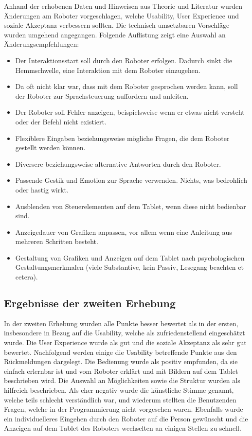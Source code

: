 \documentclass[a4paper,
fontsize=11pt,
oneside,
numbers=noperiodatend,
parskip=half-,
bibliography=totoc,
final
]{scrartcl}
\begin{document}
Anhand der erhobenen Daten und Hinweisen aus Theorie und Literatur
wurden Änderungen am Roboter vorgeschlagen, welche Usability, User
Experience und soziale Akzeptanz verbessern sollten. Die technisch
umsetzbaren Vorschläge wurden umgehend angegangen. Folgende Auflistung
zeigt eine Auswahl an Änderungsempfehlungen:

\begin{itemize}
\item
  Der Interaktionsstart soll durch den Roboter erfolgen. Dadurch sinkt
  die Hemmschwelle, eine Interaktion mit dem Roboter einzugehen.
\item
  Da oft nicht klar war, dass mit dem Roboter gesprochen werden kann,
  soll der Roboter zur Sprachsteuerung auffordern und anleiten.
\item
  Der Roboter soll Fehler anzeigen, beispielsweise wenn er etwas nicht
  versteht oder der Befehl nicht existiert.
\item
  Flexiblere Eingaben beziehungsweise mögliche Fragen, die dem Roboter
  gestellt werden können.
\item
  Diversere beziehungsweise alternative Antworten durch den Roboter.
\item
  Passende Gestik und Emotion zur Sprache verwenden. Nichts, was
  bedrohlich oder hastig wirkt.
\item
  Ausblenden von Steuerelementen auf dem Tablet, wenn diese nicht
  bedienbar sind.
\item
  Anzeigedauer von Grafiken anpassen, vor allem wenn eine Anleitung aus
  mehreren Schritten besteht.
\item
  Gestaltung von Grafiken und Anzeigen auf dem Tablet nach
  psychologischen Gestaltungsmerkmalen (viele Substantive, kein Passiv,
  Lesegang beachten et cetera).
\end{itemize}

\hypertarget{ergebnisse-der-zweiten-erhebung}{%
\subsection{Ergebnisse der zweiten Erhebung}\label{ergebnisse-der-zweiten-erhebung}}

In der zweiten Erhebung wurden alle Punkte besser bewertet als in der
ersten, insbesondere in Bezug auf die Usability, welche als
zufriedenstellend eingeschätzt wurde. Die User Experience wurde als gut
und die soziale Akzeptanz als sehr gut bewertet. Nachfolgend werden
einige die Usability betreffende Punkte aus den Rückmeldungen dargelegt.
Die Bedienung wurde als positiv empfunden, da sie einfach erlernbar ist
und vom Roboter erklärt und mit Bildern auf dem Tablet beschrieben wird.
Die Auswahl an Möglichkeiten sowie die Struktur wurden als hilfreich
beschrieben. Als eher negativ wurde die künstliche Stimme genannt,
welche teils schlecht verständlich war, und wiederum stellten die
Benutzenden Fragen, welche in der Programmierung nicht vorgesehen waren.
Ebenfalls wurde ein individuelleres Eingehen durch den Roboter auf die
Person gewünscht und die Anzeigen auf dem Tablet des Roboters wechselten
an einigen Stellen zu schnell.
\end{document}
